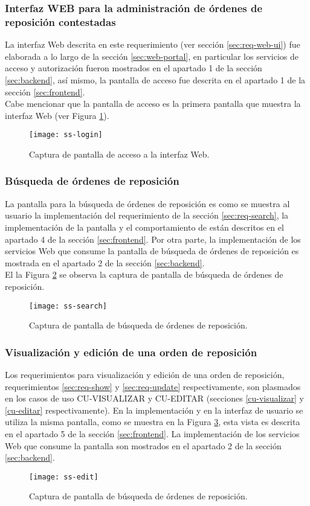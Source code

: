 \subsubsection{Interfaz WEB para la administración de órdenes de reposición contestadas}
La interfaz Web descrita en este requerimiento (ver sección \ref{sec:req-web-ui}) fue elaborada a lo largo de la sección \ref{sec:web-portal}, en particular los servicios de acceso y autorización fueron mostrados en el apartado 1 de la sección \ref{sec:backend}, así mismo, la pantalla de acceso fue descrita en el apartado 1 de la sección \ref{sec:frontend}.\\
Cabe mencionar que la pantalla de acceso es la primera pantalla que muestra la interfaz Web (ver Figura \ref{fig:ss-login}).
\begin{figure}[h]
	\centering
	\texttt{[image: ss-login]}
	\caption{Captura de pantalla de acceso a la interfaz Web.}
	\label{fig:ss-login}
\end{figure}

\subsubsection{Búsqueda de órdenes de reposición}
La pantalla para la búsqueda de órdenes de reposición es como se muestra al usuario la implementación del requerimiento de la sección \ref{sec:req-search}, la implementación de la pantalla y el comportamiento de están descritos en el apartado 4 de la sección \ref{sec:frontend}. Por otra parte, la implementación de los servicios Web que consume la pantalla de búsqueda de órdenes de reposición es mostrada en el apartado 2 de la sección \ref{sec:backend}.\\
El la Figura \ref{fig:ss-search} se observa la captura de pantalla de búsqueda de órdenes de reposición.
\begin{figure}[h]
	\centering
	\texttt{[image: ss-search]}
	\caption{Captura de pantalla de búsqueda de órdenes de reposición.}
	\label{fig:ss-search}
\end{figure}

\subsubsection{Visualización y edición de una orden de reposición}
Los requerimientos para visualización y edición de una orden de reposición, requerimientos \ref{sec:req-show} y \ref{sec:req-update} respectivamente, son plasmados en los casos de uso CU-VISUALIZAR y CU-EDITAR (secciones \ref{cu-visualizar} y \ref{cu-editar} respectivamente). En la implementación y en la interfaz de usuario se utiliza la misma pantalla, como se muestra en la Figura \ref{fig:ss-edit}, esta vista es descrita en el apartado 5 de la sección \ref{sec:frontend}. La implementación de los servicios Web que consume la pantalla son mostrados en el apartado 2 de la sección \ref{sec:backend}.
\begin{figure}[h]
	\centering
	\texttt{[image: ss-edit]}
	\caption{Captura de pantalla de búsqueda de órdenes de reposición.}
	\label{fig:ss-edit}
\end{figure}

